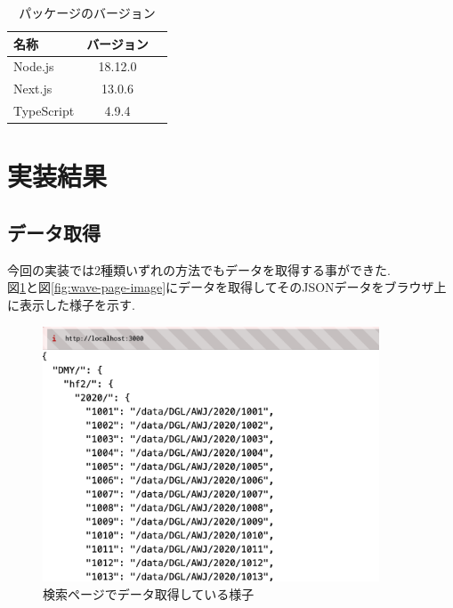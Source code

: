 \begin{table}[hbtp]
	\caption{パッケージのバージョン}
	\label{table:version}
	\centering
	\begin{tabular}{lcr}
		\hline
		名称         & バージョン   \\
		\hline \hline
		Node.js    & 18.12.0 \\
		Next.js    & 13.0.6  \\
		TypeScript & 4.9.4   \\
		
		\hline
	\end{tabular}
\end{table}


\section{実装結果}
\subsection{データ取得}
今回の実装では2種類いずれの方法でもデータを取得する事ができた.\\
図\ref{fig:search-page-image}と図\ref{fig:wave-page-image}にデータを取得してそのJSONデータをブラウザ上に表示した様子を示す.

\begin{figure}[htbp]
	\begin{center}
		\includegraphics[width=100mm]{./images/search-page-image.png}
		\caption{検索ページでデータ取得している様子}\label{fig:search-page-image}
	\end{center}
\end{figure}

